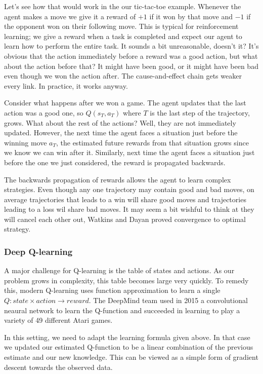 \documentclass{article}
\theoremstyle{changedot}
\theoremstyle{changedotbreak}
\theoremstyle{nonumberplain}
\begin{document}
Let's see how that would work in the our tic-tac-toe example. Whenever the agent makes a move we give it a reward of $+1$ if it won by that move and $-1$ if the opponent won on their following move. This is typical for reinforcement learning; we give a reward when a task is completed and expect our agent to learn how to perform the entire task. It sounds a bit unreasonable, doesn't it? It's obvious that the action immediately before a reward was a good action, but what about the action before that? It might have been good, or it might have been bad even though we won the action after. The cause-and-effect chain gets weaker every link. In practice, it works anyway.

Consider what happens after we won a game. The agent updates that the last action was a good one, so $Q(s_{T}, a_{T})$ where $T$ is the last step of the trajectory, grows. What about the rest of the actions? Well, they are not immediately updated. However, the next time the agent faces a situation just before the winning move $a_{T}$, the estimated future rewards from that situation grows since we know we can win after it. Similarly, next time the agent faces a situation just before the one we just considered, the reward is propagated backwards.

The backwards propagation of rewards allows the agent to learn complex strategies. Even though any one trajectory may contain good and bad moves, on average trajectories that leads to a win will share good moves and trajectories leading to a loss wil share bad moves. It may seem a bit wishful to think at they will cancel each other out, Watkins and Dayan proved convergence to optimal strategy.

\subsubsection{Deep Q-learning}
A major challenge for Q-learning is the table of states and actions. As our problem grows in complexity, this table becomes large very quickly. To remedy this, modern Q-learning uses function approximation to learn a single $Q : state \times action \to reward$. The DeepMind team used in 2015 a convolutional neaural network to learn the Q-function and succeeded in learning to play a variety of 49 different Atari games.

In this setting, we need to adapt the learning formula given above. In that case we updated our estimated Q-function to be a linear combination of the previous estimate and our new knowledge. This can be viewed as a simple form of gradient descent towards the observed data.
\end{document}
